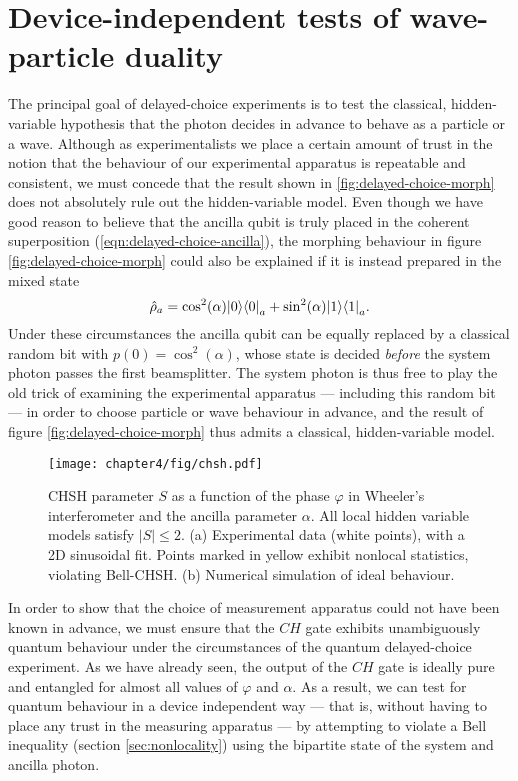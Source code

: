 \section{Device-independent tests of wave-particle duality} 
The principal goal of delayed-choice experiments is to test the classical, hidden-variable hypothesis that the photon decides in advance to behave as a particle or a wave. Although as experimentalists we place a certain amount of trust in the notion that the behaviour of our experimental apparatus is repeatable and consistent, we must concede that the result shown in \ref{fig:delayed-choice-morph} does not absolutely rule out the hidden-variable model. Even though we have good reason to believe that the ancilla qubit is truly placed in the coherent superposition (\ref{eqn:delayed-choice-ancilla}), the morphing behaviour in figure \ref{fig:delayed-choice-morph} could also be explained if it is instead prepared in the mixed state 
\begin{equation}
    \hat{\rho}_a = \cos^2(\alpha) \mbox{$ | 0 \rangle $}\mbox{$ \langle 0 | $}_a+\sin^2(\alpha)\mbox{$ | 1 \rangle $}\mbox{$ \langle 1 | $}_a.
\end{equation}
Under these circumstances the ancilla qubit can be equally replaced by a classical random bit with $p(0)=\cos^2(\alpha)$, whose state is decided \emph{before} the system photon passes the first beamsplitter. The system photon is thus free to play the old trick of examining the experimental apparatus --- including this random bit --- in order to choose particle or wave behaviour in advance, and the result of figure \ref{fig:delayed-choice-morph} thus admits a classical, hidden-variable model.

\begin{figure}[t]
\centering
\texttt{[image: chapter4/fig/chsh.pdf]}
\caption[Nonlocal statistics in a quantum delayed-choice experiment.]{CHSH parameter $S$ as a function of the phase $\varphi$ in Wheeler's interferometer and the ancilla parameter $\alpha$. All local hidden variable models satisfy $|S|\le2$. (a) Experimental data (white points), with a 2D sinusoidal fit. Points marked in yellow exhibit nonlocal statistics, violating Bell-CHSH. (b) Numerical simulation of ideal behaviour.
}
\label{fig:delayed-choice-chsh}
\end{figure}

In order to show that the choice of measurement apparatus could not have been known in advance, we must ensure that the $CH$ gate exhibits unambiguously quantum behaviour under the circumstances of the quantum delayed-choice experiment. As we have already seen, the output of the $CH$ gate is ideally pure and entangled for almost all values of $\varphi$ and $\alpha$. As a result, we can test for quantum behaviour in a device independent way --- that is, without having to place any trust in the measuring apparatus --- by attempting to violate a Bell inequality (section \ref{sec:nonlocality}) using the bipartite state of the system and ancilla photon.

